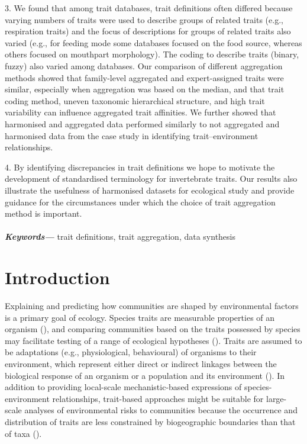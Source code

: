 \documentclass[12pt]{article}
\providecommand{\keywords}[1]
{
  \small	
  \textbf{\textit{Keywords---}} #1
}
\begin{document}
3. We found that among trait databases, trait definitions often differed because varying numbers of traits were used to describe groups of related traits (e.g., respiration traits) and the focus of descriptions for groups of related traits also varied (e.g., for feeding mode some databases focused on the food source, whereas others focused on mouthpart morphology). The coding to describe traits (binary, fuzzy) also varied among databases. Our comparison of different aggregation methods showed that family-level aggregated and expert-assigned traits were similar, especially when aggregation was based on the median, and that trait coding method, uneven taxonomic hierarchical structure, and high trait variability can influence aggregated trait affinities. We further showed that harmonised and aggregated data performed similarly to not aggregated and harmonised data from the case study in identifying trait–environment relationships.

4. By identifying discrepancies in trait definitions we hope to motivate the development of standardised terminology for invertebrate traits. Our results also illustrate the usefulness of harmonised datasets for ecological study and provide guidance for the circumstances under which the choice of trait aggregation method is important.
\\
\\
\keywords{trait definitions, trait aggregation, data synthesis}

\newpage

\section*{Introduction}

Explaining and predicting how communities are shaped by environmental factors is a primary goal of ecology. Species traits are measurable properties of an organism (\cite{mcgill_rebuilding_2006}), and comparing communities based on the traits possessed by species may facilitate testing of a range of ecological hypotheses (\cite{statzner_perspectives_2001}). Traits are assumed to be adaptations (e.g., physiological, behavioural) of organisms to their environment, which represent either direct or indirect linkages between the biological response of an organism or a population and its environment (\cite{southwood_habitat_1977, verberk_delivering_2013}). In addition to providing local-scale mechanistic-based expressions of species-environment relationships, trait-based approaches might be suitable for large-scale analyses of environmental risks to communities because the occurrence and distribution of traits are less constrained by biogeographic boundaries than that of taxa (\cite{baird_toward_2011, bonada_taxonomic_2007}). 
\end{document}
